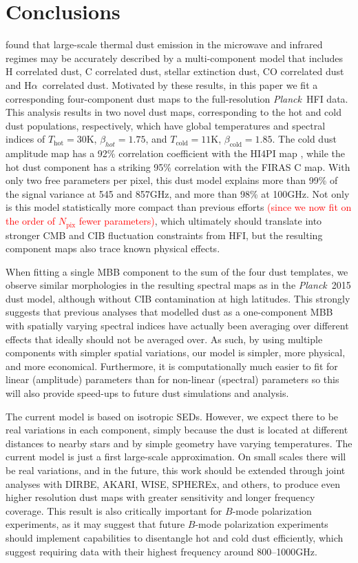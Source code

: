 \documentclass{aa}
\makeatletter
\DeclareRobustCommand{\ion}[2]{%
\relax\ifmmode
\ifx\testbx\f@series
{\mathbf{#1\,\mathsc{#2}}}\else
{\mathrm{#1\,\mathsc{#2}}}\fi
\else\textup{#1\,{\mdseries\textsc{#2}}}%
\fi}
\newcommand{\mathsc}[1]{{\normalfont\textsc{#1}}}
\def\planck{\textit{Planck}}
\def\Ha{H$\alpha$}
\def\,{\thinspace}
\newcommand{\edit}[1]{\textcolor{red}{#1}}
\makeatother
\begin{document}
\section{Conclusions}
\label{sec:conc}

\cite{CG02_05} found that large-scale thermal dust emission in the microwave and infrared regimes may be accurately described by a multi-component model that includes \ion{H}{i} correlated dust, \ion{C}{ii} correlated dust, stellar extinction dust, CO correlated dust and \Ha\ correlated dust. Motivated by these results, in this paper we fit a corresponding four-component dust maps to the full-resolution \planck\ HFI data. This analysis results in two novel dust maps, corresponding to the hot and cold dust populations, respectively, which have global temperatures and spectral indices of $T_\mathrm{hot}=30$\,K, $\beta_{hot}=1.75$, and $T_\mathrm{cold}=11$\,K, $\beta_\mathrm{cold}=1.85$. The cold dust amplitude map has a 92\% correlation coefficient with the HI4PI map \citep{HI4PI2016}, while the hot dust component has a striking 95\% correlation with the FIRAS \ion{C}{ii} map. With only two free parameters per pixel, this dust model explains more than 99\,\% of the signal variance at 545 and 857\,GHz, and more than 98\,\% at 100\,GHz. Not only is this model statistically more compact than previous efforts \edit{(since we now fit on the order of $N_\mathrm{pix}$ fewer parameters)}, which ultimately should translate into stronger CMB and CIB fluctuation constraints from HFI, but the resulting component maps also trace known physical effects.  

When fitting a single MBB component to the sum of the four dust templates, we observe similar morphologies in the resulting spectral maps as in the \planck\ 2015 dust model, although without CIB contamination at high latitudes. This strongly suggests that previous analyses that modelled dust as a one-component MBB with spatially varying spectral indices have actually been averaging over different effects that ideally should not be averaged over. As such, by using multiple components with simpler spatial variations, our model is simpler, more physical, and more economical. Furthermore, it is computationally much easier to fit for linear (amplitude) parameters than for non-linear (spectral) parameters so this will also provide speed-ups to future dust simulations and analysis. 

The current model is based on isotropic SEDs. However, we expect there to be real variations in each component, simply because the dust is located at different distances to nearby stars and by simple geometry have varying temperatures. The current model is just a first large-scale approximation. On small scales there will be real variations, and in the future, this work should be extended through joint analyses with DIRBE, AKARI, WISE, SPHEREx, and others, to produce even higher resolution dust maps with greater sensitivity and longer frequency coverage. 
This result is also critically important for $B$-mode polarization experiments, as it may suggest that future $B$-mode polarization experiments should implement capabilities to disentangle hot and cold dust efficiently, which suggest requiring data with their highest frequency around 800--1000\,GHz. 
\end{document}
